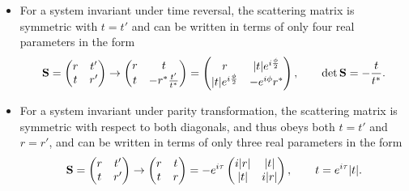 \documentclass[11pt, a4paper]{article}
\newcommand{\mat}[1]{\mathbf{#1}}  %
\renewcommand{\SS}{\mat{S}}  %
\begin{document}
\begin{itemize}
    \item For a system invariant under time reversal, the scattering matrix is symmetric with $ t = t' $ and can be written in terms of only four real parameters in the form
    \begin{equation*}
        \SS = 
        \begin{pmatrix}
            r & t'\\
            t & r'
        \end{pmatrix}
        \to
        \begin{pmatrix}
            r & t\\
            t & - r^{*}\frac{t'}{t^{*}}
        \end{pmatrix}
        = 
        \begin{pmatrix}
            r & \abs{t}e^{i\frac{\phi}{2}}\\
            \abs{t}e^{i\frac{\phi}{2}} & - e^{i\phi}r^{*}
        \end{pmatrix}, \qquad \det \SS = - \frac{t}{t^{*}}.
    \end{equation*}

    \item For a system invariant under parity transformation, the scattering matrix is symmetric with respect to both diagonals, and thus obeys both $ t = t' $ and $ r = r' $, and can be written in terms of only three real parameters in the form
    \begin{equation*}
        \SS = 
        \begin{pmatrix}
            r & t'\\
            t & r'
        \end{pmatrix} 
        \to
        \begin{pmatrix}
            r & t\\
            t & r
        \end{pmatrix} 
        = - e^{i\tau}
        \begin{pmatrix}
            i \abs{r} & \abs{t}\\
            \abs{t} & i \abs{r}
        \end{pmatrix}, 
        \qquad t = e^{i\tau}\abs{t}.
    \end{equation*}
    
\end{itemize}
\end{document}

